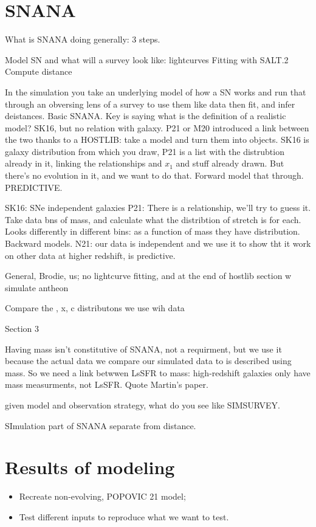 \documentclass[]{aa}
\begin{document}
\section{SNANA}
What is SNANA doing generally: 3 steps.

Model SN and what will a survey look like: lightcurves
Fitting with SALT.2
Compute distance

In the simulation you take an underlying model of how a SN works and run that
through an obversing lens of a survey to use them like data then fit, and infer
deistances. Basic SNANA. Key is saying what is the definition of a realistic
model? SK16, but no relation with galaxy. P21 or M20 introduced a link between
the two thanks to a HOSTLIB: take a model and turn them into objects. SK16 is
galaxy distribution from which you draw, P21 is a list with the distrubtion
already in it, linking the relationships and $x_1$ and stuff already drawn. But
there's no evolution in it, and we want to do that. Forward model that through.
PREDICTIVE.

SK16: SNe independent galaxies
P21: There is a relationship, we'll try to guess it. Take data bns of mass, and
calculate what the distribtion of stretch is for each. Looks differently in
different bins: as a function of mass they have distribution. Backward models.
N21: our data is independent and we use it to show tht it work on other data at
higher redshift, is predictive.

General, Brodie, us; no lightcurve fitting, and at the end of hostlib section w
simulate antheon

Compare the , x, c distributons we use wih data

Section 3

Having mass isn't constitutive of SNANA, not a requirment, but we use it because
the actual data we compare our simulated data to is described using mass. So we
need a link betwwen LsSFR to mass: high-redshift galaxies only have mass
measurments, not LsSFR. Quote Martin's paper.

given model and observation strategy, what do you see like SIMSURVEY.

SImulation part of SNANA separate from distance.


\section{Results of modeling}
\begin{itemize}
    \item Recreate non-evolving, POPOVIC 21 model;
    \item Test different inputs to reproduce what we want to test.
\end{itemize}
\end{document}
